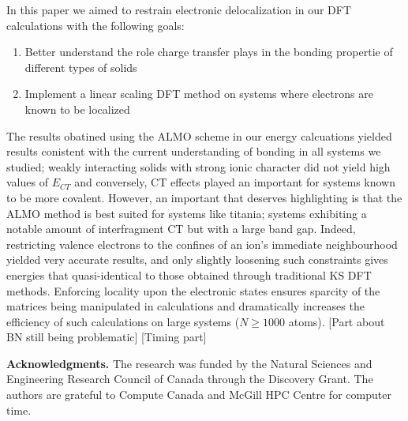 \documentclass[aps,prb,twocolumn,amsmath,amssymb,superscriptaddress,longbibliography]{revtex4-1}
\begin{document}
In this paper we aimed to restrain electronic delocalization in our DFT calculations with the following goals:
\begin{enumerate}
\item{Better understand the role charge transfer plays in the bonding propertie of different types of solids}
\item{Implement a linear scaling DFT method on systems where electrons are known to be localized}
\end{enumerate}
The results obatined using the ALMO scheme in our energy calcuations yielded results conistent with the current understanding of bonding in all systems we studied; weakly interacting solids with strong ionic character did not yield high values of $E_{CT}$ and conversely, CT effects played an important for systems known to be more covalent.
However, an important that deserves highlighting is that the ALMO method is best suited for systems like titania; systems exhibiting a notable amount of interfragment CT but with a large band gap. Indeed, restricting valence electrons to the confines of an ion's immediate neighbourhood yielded very accurate results, and only slightly loosening such constraints gives energies that quasi-identical to those obtained through traditional KS DFT methods. Enforcing locality upon the electronic states ensures sparcity of the matrices being manipulated in calculations and dramatically increases the efficiency of such calculations on large systems ($N\geq 1000$ atoms).
[Part about BN still being problematic]
[Timing part]



\textbf{Acknowledgments.} The research was funded by the Natural Sciences and Engineering Research Council of Canada through the Discovery Grant. The authors are grateful to Compute Canada and McGill HPC Centre for computer time.


%
\end{document}
